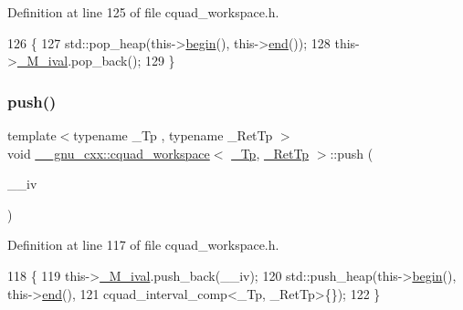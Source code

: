 Definition at line 125 of file cquad\+\_\+workspace.\+h.


\begin{DoxyCode}
126       \{
127         std::pop\_heap(this->\hyperlink{struct____gnu__cxx_1_1cquad__workspace_adf18a306dbf58cb00b4c6254266816bc}{begin}(), this->\hyperlink{struct____gnu__cxx_1_1cquad__workspace_a61729a1acaa035013ebb0ed6e4ffcbf4}{end}());
128         this->\hyperlink{struct____gnu__cxx_1_1cquad__workspace_a46edeb05c52f2a406dc582b404fe83e6}{\_M\_ival}.pop\_back();
129       \}
\end{DoxyCode}
\mbox{\label{struct____gnu__cxx_1_1cquad__workspace_ab8b17ed5aea295adbf9a70b84498c948}} 
\subsubsection{\texorpdfstring{push()}{push()}}
{\footnotesize\ttfamily template$<$typename \+\_\+\+Tp , typename \+\_\+\+Ret\+Tp $>$ \\
void \hyperlink{struct____gnu__cxx_1_1cquad__workspace}{\+\_\+\+\_\+gnu\+\_\+cxx\+::cquad\+\_\+workspace}$<$ \hyperlink{namespace____gnu__cxx_a3b19a9c800ca194374ef9172290f7d79}{\+\_\+\+Tp}, \hyperlink{namespace____gnu__cxx_a886e03ece3d53ff7fa6c098a40f93fa5}{\+\_\+\+Ret\+Tp} $>$\+::push (\begin{DoxyParamCaption}\item[{const \hyperlink{struct____gnu__cxx_1_1cquad__interval}{cquad\+\_\+interval}$<$ \hyperlink{namespace____gnu__cxx_a3b19a9c800ca194374ef9172290f7d79}{\+\_\+\+Tp}, \hyperlink{namespace____gnu__cxx_a886e03ece3d53ff7fa6c098a40f93fa5}{\+\_\+\+Ret\+Tp} $>$ \&}]{\+\_\+\+\_\+iv }\end{DoxyParamCaption})\hspace{0.3cm}{\ttfamily [inline]}}



Definition at line 117 of file cquad\+\_\+workspace.\+h.


\begin{DoxyCode}
118       \{
119         this->\hyperlink{struct____gnu__cxx_1_1cquad__workspace_a46edeb05c52f2a406dc582b404fe83e6}{\_M\_ival}.push\_back(\_\_iv);
120         std::push\_heap(this->\hyperlink{struct____gnu__cxx_1_1cquad__workspace_adf18a306dbf58cb00b4c6254266816bc}{begin}(), this->\hyperlink{struct____gnu__cxx_1_1cquad__workspace_a61729a1acaa035013ebb0ed6e4ffcbf4}{end}(),
121                        cquad\_interval\_comp<\_Tp, \_RetTp>\{\});
122       \}
\end{DoxyCode}
\mbox{\label{struct____gnu__cxx_1_1cquad__workspace_aafe82f4041e233329f4510ca34a9e619}} 
